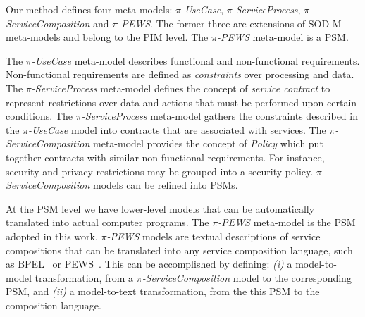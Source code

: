 Our method defines four meta-models: \textit{$\pi$-UseCase}, \textit{$\pi$-ServiceProcess}, \textit{$\pi$-ServiceCom\-po\-si\-tion} and \textit{$\pi$-PEWS}.
The former three are extensions of SOD-M meta-models and belong to the PIM level.
The \textit{$\pi$-PEWS} meta-model is a PSM.

The \textit{$\pi$-UseCase} meta-model describes functional and non-functional requirements.
Non-functional requirements are defined as \textit{constraints} over processing and data.
The \textit{$\pi$-ServiceProcess} meta-model defines the concept of \textit{service contract} to represent restrictions over data and actions that must be performed upon certain conditions.
The \textit{$\pi$-ServiceProcess} meta-model gathers the constraints
described in the \textit{$\pi$-UseCase} model into contracts that are associated
with services.
The \textit{$\pi$-ServiceComposition} meta-model provides the concept of \textit{Policy}
which put together contracts with similar non-functional requirements.
For instance, security and privacy restrictions may be grouped into a security policy.
\textit{$\pi$-ServiceComposition} models can be refined into PSMs.

At the PSM level we have lower-level models that can be automatically translated into actual computer programs.
The \textit{$\pi$-PEWS} meta-model is the PSM adopted in this work.
\textit{$\pi$-PEWS} models are textual descriptions of service compositions that can be translated into any service composition language, such as BPEL~\cite{bpel03} or PEWS~\cite{BaCAM05,Placido2010LTPD}.
This can be accomplished by defining: \textit{(i)} a model-to-model transformation, from a \textit{$\pi$-ServiceComposition} model to the corresponding PSM, and \textit{(ii)} a model-to-text transformation, from the this PSM to the composition language.



